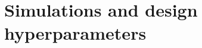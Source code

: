 \documentclass[letterpaper, 12pt, parskip=full,]{scrartcl}
\begin{document}
% 
%


\section{Simulations and design hyperparameters}\label{simulations}
\end{document}
